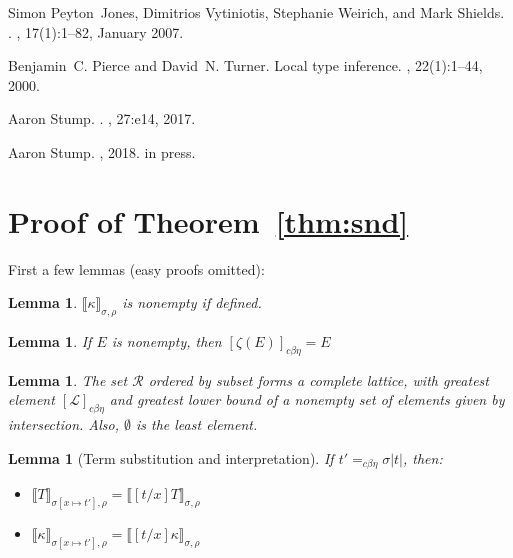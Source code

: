 \documentclass{article}
\newcommand{\choice}[0]{\zeta}
\newcommand{\interp}[1]{\llbracket #1 \rrbracket}
\newcommand{\cbe}[0]{c\beta\eta}
\newtheorem{lemma}[theorem]{Lemma}
\begin{document}
\begin{thebibliography}{10}
Simon Peyton~Jones, Dimitrios Vytiniotis, Stephanie Weirich, and Mark Shields.
.
, 17(1):1--82, January 2007.

Benjamin~C. Pierce and David~N. Turner.
\newblock Local type inference.
, 22(1):1--44, 2000.

Aaron Stump.
.
, 27:e14, 2017.

Aaron Stump.
, 2018.
\newblock in press.

\end{thebibliography}


\appendix

\section{Proof of Theorem~\ref{thm:snd}}

First a few lemmas (easy proofs omitted):

\begin{lemma}
  $\interp{\kappa}_{\sigma,\rho}$ is nonempty if defined.
\end{lemma}

\begin{lemma}
\label{lem:choice}
If $E$ is nonempty, then $[\choice(E)]_{\cbe} = E$
\end{lemma}

\begin{lemma}
  The set $\mathcal{R}$ ordered by subset forms a complete lattice,
  with greatest element $[\mathcal{L}]_{\cbe}$ and greatest lower bound
  of a nonempty set of elements given by
  intersection.  Also, $\emptyset$ is the least element.
\end{lemma}

\begin{lemma}[Term substitution and interpretation]
\label{lem:termsubstinterp}
If $t' =_{\cbe} \sigma |t|$, then: 
\begin{itemize}
\item $\interp{T}_{\sigma[x\mapsto t'],\rho} = \interp{[t/x]T}_{\sigma,\rho}$
\item $\interp{\kappa}_{\sigma[x\mapsto t'],\rho} = \interp{[t/x]\kappa}_{\sigma,\rho}$
\end{itemize}
\end{lemma}
\end{document}
